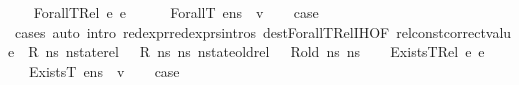\begin{isabellebody}
\isamarkupfalse%
\isanewline
\ \ \isamarkupfalse%
\ {\isacharparenleft}{\kern0pt}ForallT{\isacharunderscore}{\kern0pt}Rel\ e{}\ e{}{\isacharparenright}{\kern0pt}\isanewline
\ \ \isamarkupfalse%
\ {\isacartoucheopen}{\isasymLambda}{\isacharcomma}{\kern0pt}{\isasymGamma}{\isacharcomma}{\kern0pt}{\isasymOmega}\ {\isasymturnstile}\ {\isasymlangle}ForallT\ e{}{\isacharcomma}{\kern0pt}ns{}{\isasymrangle}\ {\isasymDown}\ v{\isacartoucheclose}\isanewline
\ \ \isamarkupfalse%
\ {\isacharquery}{\kern0pt}case\isanewline
\ \ \ \ \isamarkupfalse%
\ cases\ {\isacharparenleft}{\kern0pt}auto\ intro{\isacharcolon}{\kern0pt}\ red{\isacharunderscore}{\kern0pt}expr{\isacharunderscore}{\kern0pt}red{\isacharunderscore}{\kern0pt}exprs{\isachardot}{\kern0pt}intros\ dest{\isacharcolon}{\kern0pt}ForallT{\isacharunderscore}{\kern0pt}Rel{\isachardot}{\kern0pt}IH{\isacharparenleft}{\kern0pt}{}{\isacharparenright}{\kern0pt}{\isacharbrackleft}{\kern0pt}OF\ {\isacartoucheopen}rel{\isacharunderscore}{\kern0pt}const{\isacharunderscore}{\kern0pt}correct{\isacharunderscore}{\kern0pt}value\ {\isasymLambda}\ R\ ns{}{\isacartoucheclose}\ {\isacartoucheopen}nstate{\isacharunderscore}{\kern0pt}rel\ {\isasymLambda}\ {\isasymLambda}{\isacharprime}{\kern0pt}\ R\ ns{}\ ns{}{\isacartoucheclose}\ {\isacartoucheopen}nstate{\isacharunderscore}{\kern0pt}old{\isacharunderscore}{\kern0pt}rel\ {\isasymLambda}\ {\isasymLambda}{\isacharprime}{\kern0pt}\ R{\isacharunderscore}{\kern0pt}old\ ns{}\ ns{}{\isacartoucheclose}{\isacharbrackright}{\kern0pt}{\isacharparenright}{\kern0pt}\isanewline
{}\isamarkupfalse%
\isanewline
\ \ \isamarkupfalse%
\ {\isacharparenleft}{\kern0pt}ExistsT{\isacharunderscore}{\kern0pt}Rel\ e{}\ e{}{\isacharparenright}{\kern0pt}\isanewline
\ \ \isamarkupfalse%
\ {\isacartoucheopen}{\isasymLambda}{\isacharcomma}{\kern0pt}{\isasymGamma}{\isacharcomma}{\kern0pt}{\isasymOmega}\ {\isasymturnstile}\ {\isasymlangle}ExistsT\ e{}{\isacharcomma}{\kern0pt}ns{}{\isasymrangle}\ {\isasymDown}\ v{\isacartoucheclose}\isanewline
\ \ \isamarkupfalse%
\ {\isacharquery}{\kern0pt}case\isanewline
\ \ \ \ \isamarkupfalse%

\end{isabellebody}

